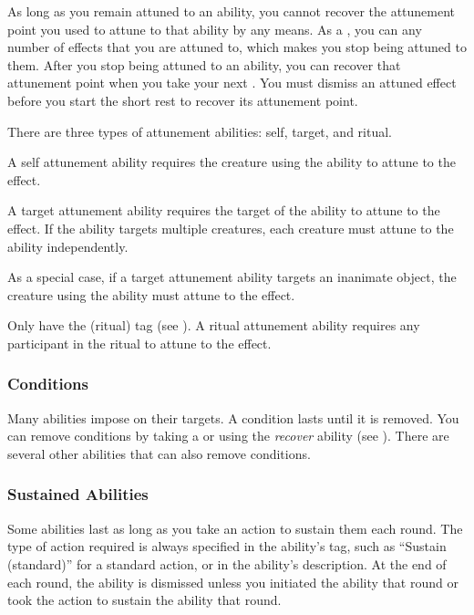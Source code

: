             As long as you remain attuned to an ability, you cannot recover the attunement point you used to attune to that ability by any means.
            As a , you can  any number of effects that you are attuned to, which makes you stop being attuned to them.
            After you stop being attuned to an ability, you can recover that attunement point when you take your next .
            You must dismiss an attuned effect before you start the short rest to recover its attunement point.

            There are three types of attunement abilities: self, target, and ritual.

             A self attunement ability requires the creature using the ability to attune to the effect.

             A target attunement ability requires the target of the ability to attune to the effect.
            If the ability targets multiple creatures, each creature must attune to the ability independently.

            As a special case, if a target attunement ability targets an inanimate object, the creature using the ability must attune to the effect.

             Only  have the  (ritual) tag (see ).
            A ritual attunement ability requires any participant in the ritual to attune to the effect.

        \subsubsection{Conditions}\label{Conditions}
            Many abilities impose  on their targets.
            A condition lasts until it is removed.
            You can remove conditions by taking a  or using the \textit{recover} ability (see ).
            There are several other abilities that can also remove conditions.

        \subsubsection{Sustained Abilities}\label{Sustained Abilities}
            Some abilities last as long as you take an action to sustain them each round.
            The type of action required is always specified in the ability's tag, such as ``Sustain (standard)'' for a standard action, or in the ability's description.
            At the end of each round, the ability is dismissed unless you initiated the ability that round or took the action to sustain the ability that round.

